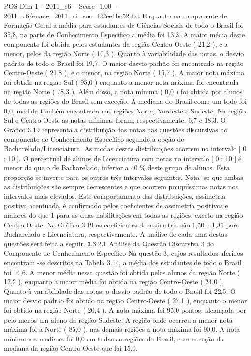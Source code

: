 \begin{textsample}{POS Dim 1 – 2011\_c6 – Score -1.00 – 2011\_c6/enade\_2011\_ci\_soc\_f22ee1bc52.txt}
Enquanto no componente de Formação Geral a média para estudantes de Ciências Sociais de todo o Brasil foi 35,8, na parte de Conhecimento Específico a média foi 13,3.
A maior média deste componente foi obtida pelos estudantes da região Centro-Oeste ( 21,2 ), e a menor, pelos da região Norte ( 10,3 ).
Quanto à variabilidade das notas, o desvio padrão de todo o Brasil foi 19,7.
O maior desvio padrão foi encontrado na região Centro-Oeste ( 21,8 ), e o menor, na região Norte ( 16,7 ).
A maior nota máxima foi obtida na região Sul ( 95,0 ) enquanto a menor nota máxima foi encontrada na região Norte ( 78,3 ).
Além disso, a nota mínima ( 0,0 ) foi obtida por alunos de todas as regiões do Brasil sem exceção.
A mediana do Brasil como um todo foi 0,0, medida também encontrada nas regiões Norte, Nordeste e Sudeste.
Na região Sul e Centro-Oeste as notas mínimas foram, respectivamente, 6,7 e 18,3.
O Gráfico 3.19 representa a distribuição das notas nas questões discursivas no componente de Conhecimento Específico segundo a opção de Bacharelado/Licenciatura.
As modas destas distribuições ocorrem no intervalo [ 0 ; 10 ].
O percentual de alunos de Licenciatura com notas no intervalo [ 0 ; 10 ] é menor do que o de Bacharelado, inferior a 40 \% deste grupo de alunos.
Esta proporção se inverte para os outros três intervalos seguintes.
Nota -se que ambas as distribuições são sempre decrescentes e que ocorrem pouquíssimas notas nos intervalos mais elevados.
Este comportamento das distribuições, assimetria positiva acentuada, é confirmado pelos coeficientes de assimetria positivos e maiores do que 1 para as duas habilitações em todas as regiões, exceto na região Centro-Oeste.
No Gráfico 3.19 os coeficientes de assimetria são 1,50 e 1,36 para Bacharelado e Licenciatura, respectivamente.
A análise de cada uma destas questões será feita a seguir. 3.3.2.1 Análise da Questão Discursiva 3 do Componente de Conhecimento Específico Na questão 3, cujos resultados aferidos encontram -se descritos na Tabela 3.14, a média dos estudantes de todo o Brasil foi 14,6.
A menor média nessa questão foi obtida pelos alunos da região Norte ( 12,2 ), enquanto a maior média foi obtida na região Centro-Oeste ( 24,0 ).
Quanto à variabilidade das notas, o desvio padrão de todo o Brasil foi 22,5.
O maior desvio padrão foi obtido na região Centro-Oeste ( 27,1 ), enquanto o menor foi obtido na região Norte ( 20,4 ).
A nota máxima foi 95,0 pontos, alcançada por pelo menos um aluno da região Sudeste.
A região onde ocorreu a menor nota máxima foi a Norte ( 85,0 ), nas demais regiões a nota máxima foi 90,0.
A nota mínima e a mediana foi 0,0 em todas as regiões do Brasil, com exceção da mediana da região Centro-Oeste que foi 15,0.

\end{textsample}
